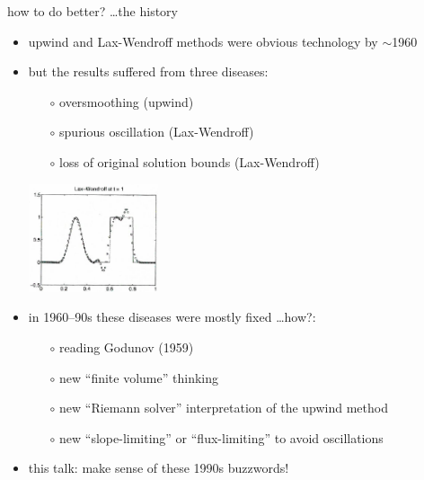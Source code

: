 \documentclass[10pt,dvipsnames,usepdftitle=false,
hyperref={pdftitle = {Finite volume methods},
    pdfauthor = {Ed Bueler}}]{beamer}
\newcommand{\Matlab}{\textsc{Matlab}\xspace}
\begin{document}
\begin{frame}{how to do better? \dots the history}

\begin{itemize}
\item upwind and Lax-Wendroff methods were obvious technology by $\sim$1960
\item but the results suffered from three diseases:
    \begin{itemize}
    \item[$\circ$] \alert{oversmoothing} (upwind)
    \item[$\circ$] \alert{spurious oscillation} (Lax-Wendroff)
    \item[$\circ$] \alert{loss of original solution bounds} (Lax-Wendroff)
    \end{itemize}

\vspace{-15mm}

\hfill \includegraphics[width=0.3\textwidth]{figs/leveque6p1lw}

\bigskip
\item in 1960--90s these diseases were mostly fixed \dots how?:
    \begin{itemize}
    \item[$\circ$] reading Godunov (1959)
    \item[$\circ$] new ``finite volume'' thinking
    \item[$\circ$] new ``Riemann solver'' interpretation of the upwind method
    \item[$\circ$] new ``slope-limiting'' or ``flux-limiting'' to avoid oscillations
    \end{itemize}

\item this talk: make sense of these 1990s buzzwords!
\end{itemize}
\end{frame}


\end{document}

